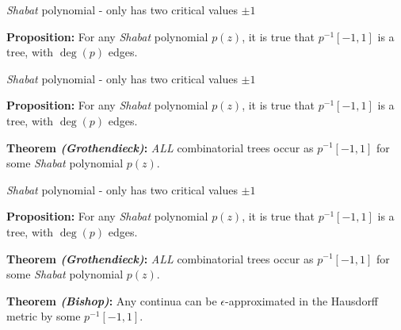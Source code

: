 \documentclass{beamer}
\begin{document}
\begin{frame}

{\it Shabat} polynomial - only has two critical values $\pm 1$

\vspace{5mm}

{\bf Proposition:} For any {\it Shabat} polynomial $p(z)$, it is true that $p^{-1}[-1,1]$ is a tree, with $\deg(p)$ edges.

\end{frame}





\begin{frame}

{\it Shabat} polynomial - only has two critical values $\pm 1$

\vspace{5mm}

{\bf Proposition:} For any {\it Shabat} polynomial $p(z)$, it is true that $p^{-1}[-1,1]$ is a tree, with $\deg(p)$ edges.

\vspace{5mm} 

{\bf Theorem {\it (Grothendieck)}:} {\it ALL} combinatorial trees occur as $p^{-1}[-1,1]$ for some {\it Shabat} polynomial $p(z)$.

\vspace{5mm}

\end{frame}




\begin{frame}

{\it Shabat} polynomial - only has two critical values $\pm 1$

\vspace{5mm}

{\bf Proposition:} For any {\it Shabat} polynomial $p(z)$, it is true that $p^{-1}[-1,1]$ is a tree, with $\deg(p)$ edges.

\vspace{5mm} 

{\bf Theorem {\it (Grothendieck)}:} {\it ALL} combinatorial trees occur as $p^{-1}[-1,1]$ for some {\it Shabat} polynomial $p(z)$.

\vspace{5mm}

{\bf Theorem {\it (Bishop)}:} Any {\color{red} continua} can be $\epsilon$-approximated in the {\color{red} Hausdorff metric} by some $p^{-1}[-1,1]$. 

\end{frame}
\end{document}
